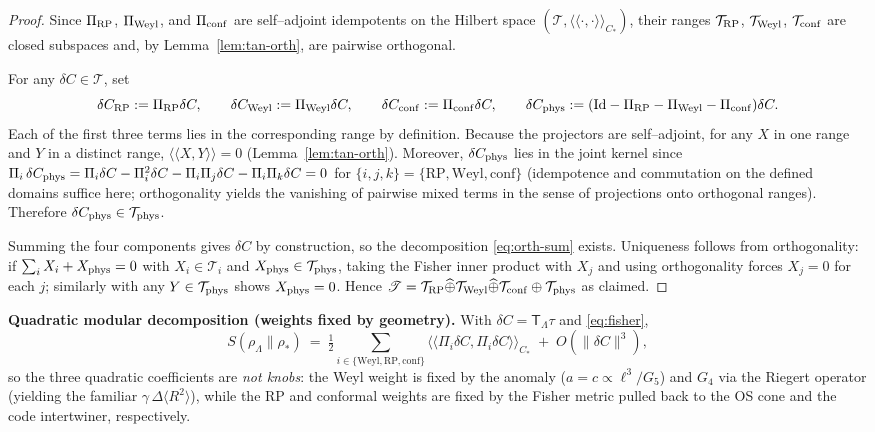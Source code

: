 \documentclass[10pt]{article}
\theoremstyle{definition}
\theoremstyle{plain}
\begin{document}
\begin{proof}
Since $\Pi_{\rm RP}$, $\Pi_{\rm Weyl}$, and $\Pi_{\rm conf}$ are self–adjoint idempotents on the
Hilbert space $(\mathscr T,\langle\!\langle\cdot,\cdot\rangle\!\rangle_{C_\ast})$, their ranges
$\mathcal T_{\rm RP}$, $\mathcal T_{\rm Weyl}$, $\mathcal T_{\rm conf}$ are closed subspaces and,
by Lemma~\ref{lem:tan-orth}, are pairwise orthogonal.

For any $\delta C\in\mathscr T$, set
\[
\delta C_{\rm RP}:=\Pi_{\rm RP}\delta C,\qquad
\delta C_{\rm Weyl}:=\Pi_{\rm Weyl}\delta C,\qquad
\delta C_{\rm conf}:=\Pi_{\rm conf}\delta C,\qquad
\delta C_{\rm phys}:=(\mathrm{Id}-\Pi_{\rm RP}-\Pi_{\rm Weyl}-\Pi_{\rm conf})\delta C.
\]
Each of the first three terms lies in the corresponding range by definition.
Because the projectors are self–adjoint, for any $X$ in one range and $Y$ in a distinct range,
$\langle\!\langle X,Y\rangle\!\rangle=0$ (Lemma~\ref{lem:tan-orth}). Moreover,
$\delta C_{\rm phys}$ lies in the joint kernel since
$\Pi_i\,\delta C_{\rm phys}=\Pi_i\delta C-\Pi_i^2\delta C-\Pi_i\Pi_j\delta C-\Pi_i\Pi_k\delta C=0$
for $\{i,j,k\}=\{\mathrm{RP},\mathrm{Weyl},\mathrm{conf}\}$ (idempotence and commutation on
the defined domains suffice here; orthogonality yields the vanishing of pairwise mixed terms
in the sense of projections onto orthogonal ranges). Therefore
$\delta C_{\rm phys}\in\mathcal T_{\rm phys}$.

Summing the four components gives $\delta C$ by construction, so the decomposition
\eqref{eq:orth-sum} exists. Uniqueness follows from orthogonality: if
$\sum_i X_i + X_{\rm phys}=0$ with $X_i\in\mathcal T_i$ and
$X_{\rm phys}\in\mathcal T_{\rm phys}$, taking the Fisher inner product with $X_j$
and using orthogonality forces $X_j=0$ for each $j$; similarly with any
$Y\in\mathcal T_{\rm phys}$ shows $X_{\rm phys}=0$.
Hence
$\mathscr T=\mathcal T_{\rm RP}\widehat\oplus\mathcal T_{\rm Weyl}\widehat\oplus
\mathcal T_{\rm conf}\oplus\mathcal T_{\rm phys}$ as claimed.
\end{proof}


\noindent\textbf{Quadratic modular decomposition (weights fixed by geometry).}
With $\delta C=\mathsf T_\Lambda\tau$ and \eqref{eq:fisher},
\begin{equation}
\label{eq:quad-sum}
S(\rho_\Lambda\|\rho_\ast)\ =\ \tfrac12\sum_{i\in\{\mathrm{Weyl,RP,conf}\}}
\big\langle\!\big\langle \Pi_i\delta C,\Pi_i\delta C\big\rangle\!\big\rangle_{C_\ast}
\;+\;O(\|\delta C\|^3),
\end{equation}
so the three quadratic coefficients are \emph{not knobs}: the Weyl weight is fixed by the anomaly
($a=c\propto \ell^3/G_5$) and $G_4$ via the Riegert operator (yielding the familiar
$\gamma\,\Delta\!\langle R^2\rangle$), while the RP and conformal weights are fixed by the Fisher
metric pulled back to the OS cone and the code intertwiner, respectively.
\end{document}
